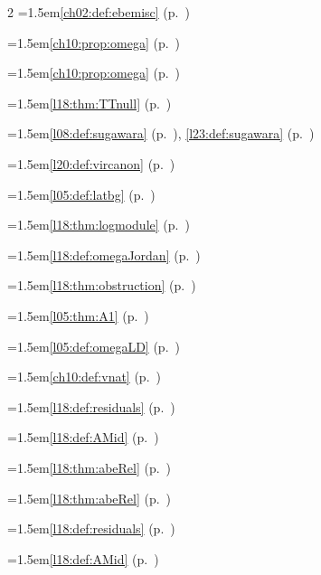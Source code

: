 \begin{multicols}{2}
\hangindent=1.5em\quad \ref{ch02:def:ebemisc} (p.~\pageref{ch02:def:ebemisc})\par
\hangindent=1.5em\quad \ref{ch10:prop:omega} (p.~\pageref{ch10:prop:omega})\par
\hangindent=1.5em\quad \ref{ch10:prop:omega} (p.~\pageref{ch10:prop:omega})\par
\hangindent=1.5em\quad \ref{l18:thm:TTnull} (p.~\pageref{l18:thm:TTnull})\par
\hangindent=1.5em\quad \ref{l08:def:sugawara} (p.~\pageref{l08:def:sugawara}), \ref{l23:def:sugawara} (p.~\pageref{l23:def:sugawara})\par
\hangindent=1.5em\quad \ref{l20:def:vircanon} (p.~\pageref{l20:def:vircanon})\par
\hangindent=1.5em\quad \ref{l05:def:latbg} (p.~\pageref{l05:def:latbg})\par
\hangindent=1.5em\quad \ref{l18:thm:logmodule} (p.~\pageref{l18:thm:logmodule})\par
\hangindent=1.5em\quad \ref{l18:def:omegaJordan} (p.~\pageref{l18:def:omegaJordan})\par
\hangindent=1.5em\quad \ref{l18:thm:obstruction} (p.~\pageref{l18:thm:obstruction})\par
\hangindent=1.5em\quad \ref{l05:thm:A1} (p.~\pageref{l05:thm:A1})\par
\hangindent=1.5em\quad \ref{l05:def:omegaLD} (p.~\pageref{l05:def:omegaLD})\par
\hangindent=1.5em\quad \ref{ch10:def:vnat} (p.~\pageref{ch10:def:vnat})\par
\hangindent=1.5em\quad \ref{l18:def:residuals} (p.~\pageref{l18:def:residuals})\par
\hangindent=1.5em\quad \ref{l18:def:AMid} (p.~\pageref{l18:def:AMid})\par
\hangindent=1.5em\quad \ref{l18:thm:abeRel} (p.~\pageref{l18:thm:abeRel})\par
\hangindent=1.5em\quad \ref{l18:thm:abeRel} (p.~\pageref{l18:thm:abeRel})\par
\hangindent=1.5em\quad \ref{l18:def:residuals} (p.~\pageref{l18:def:residuals})\par
\hangindent=1.5em\quad \ref{l18:def:AMid} (p.~\pageref{l18:def:AMid})\par

\end{multicols}
